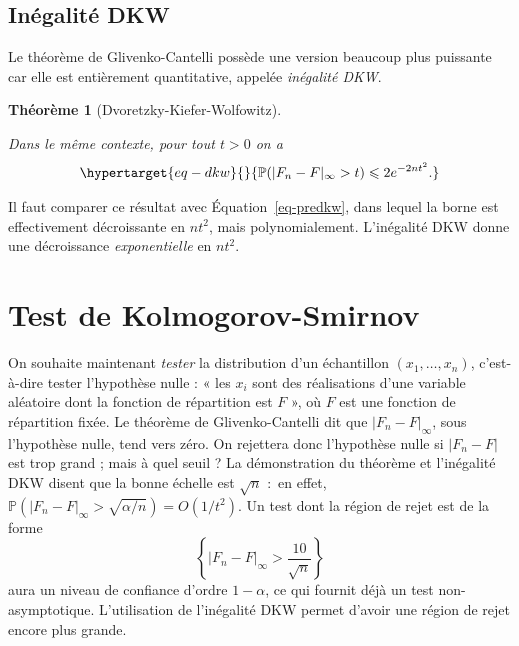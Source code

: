 \documentclass[
  10,
  letterpaper,
  DIV=11,
  numbers=noendperiod]{scrreport}
\theoremstyle{plain}
\newtheorem{theorem}{Théorème}[chapter]
\theoremstyle{definition}
\theoremstyle{plain}
\theoremstyle{definition}
\theoremstyle{definition}
\theoremstyle{plain}
\theoremstyle{remark}
\begin{document}
\hypertarget{inuxe9galituxe9-dkw}{%
\section{Inégalité DKW}\label{inuxe9galituxe9-dkw}}

Le théorème de Glivenko-Cantelli possède une version beaucoup plus
puissante car elle est entièrement quantitative, appelée \emph{inégalité
DKW}.

\begin{theorem}[Dvoretzky-Kiefer-Wolfowitz]\protect\hypertarget{thm-DKW}{}\label{thm-DKW}

Dans le même contexte, pour tout \(t>0\) on a
\begin{equation}\protect\hypertarget{eq-dkw}{}{\mathbb{P}(|F_n - F|_\infty > t) \leqslant 2e^{-2nt^2}.}\label{eq-dkw}\end{equation}

\end{theorem}

Il faut comparer ce résultat avec Équation~\ref{eq-predkw}, dans lequel
la borne est effectivement décroissante en \(nt^2\), mais
polynomialement. L'inégalité DKW donne une décroissance
\emph{exponentielle} en \(nt^2\).


\hypertarget{test-de-kolmogorov-smirnov}{%
\chapter{Test de Kolmogorov-Smirnov}\label{test-de-kolmogorov-smirnov}}

On souhaite maintenant \emph{tester} la distribution d'un échantillon
\((x_1, \dotsc, x_n)\), c'est-à-dire tester l'hypothèse nulle : « les
\(x_i\) sont des réalisations d'une variable aléatoire dont la fonction
de répartition est \(F\) », où \(F\) est une fonction de répartition
fixée. Le théorème de Glivenko-Cantelli dit que \(|F_n - F|_\infty\),
sous l'hypothèse nulle, tend vers zéro. On rejettera donc l'hypothèse
nulle si \(|F_n - F|\) est trop grand ; mais à quel seuil ? La
démonstration du théorème et l'inégalité DKW disent que la bonne échelle
est \(\sqrt{n}\) :~en effet,
\(\mathbb{P}(|F_n - F|_\infty > \sqrt{\alpha/n}) = O(1/t^2)\). Un test
dont la région de rejet est de la forme
\[\left\lbrace |F_n - F|_\infty > \frac{10}{\sqrt{n}}\right\rbrace\]
aura un niveau de confiance d'ordre \(1-\alpha\), ce qui fournit déjà un
test non-asymptotique. L'utilisation de l'inégalité DKW permet d'avoir
une région de rejet encore plus grande.
\end{document}
